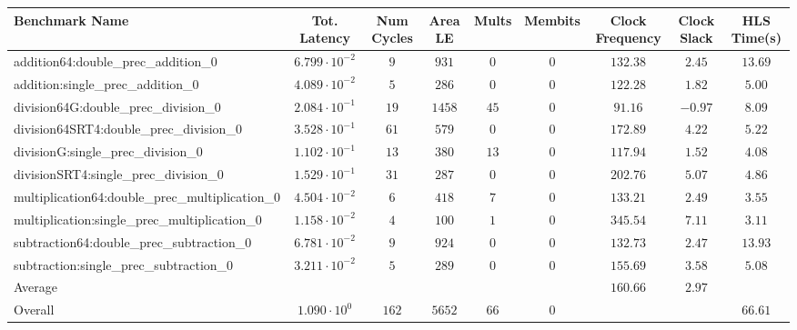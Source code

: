\begin{tabular}{|l|c|c|c|c|c|c|c|c|}
\hline
Benchmark Name                                   & Tot. Latency            & Num Cycles & Area LE  & Mults  & Membits & Clock Frequency & Clock Slack & HLS Time(s) \\
\hline
addition64:double\_prec\_addition\_0             & $ 6.799 \cdot 10^{-2} $ & $ 9      $ & $ 931  $ & $ 0  $ & $ 0   $ & $ 132.38      $ & $ 2.45    $ & $ 13.69   $ \\
addition:single\_prec\_addition\_0               & $ 4.089 \cdot 10^{-2} $ & $ 5      $ & $ 286  $ & $ 0  $ & $ 0   $ & $ 122.28      $ & $ 1.82    $ & $ 5.00    $ \\
division64G:double\_prec\_division\_0            & $ 2.084 \cdot 10^{-1} $ & $ 19     $ & $ 1458 $ & $ 45 $ & $ 0   $ & $ 91.16       $ & $ -0.97   $ & $ 8.09    $ \\
division64SRT4:double\_prec\_division\_0         & $ 3.528 \cdot 10^{-1} $ & $ 61     $ & $ 579  $ & $ 0  $ & $ 0   $ & $ 172.89      $ & $ 4.22    $ & $ 5.22    $ \\
divisionG:single\_prec\_division\_0              & $ 1.102 \cdot 10^{-1} $ & $ 13     $ & $ 380  $ & $ 13 $ & $ 0   $ & $ 117.94      $ & $ 1.52    $ & $ 4.08    $ \\
divisionSRT4:single\_prec\_division\_0           & $ 1.529 \cdot 10^{-1} $ & $ 31     $ & $ 287  $ & $ 0  $ & $ 0   $ & $ 202.76      $ & $ 5.07    $ & $ 4.86    $ \\
multiplication64:double\_prec\_multiplication\_0 & $ 4.504 \cdot 10^{-2} $ & $ 6      $ & $ 418  $ & $ 7  $ & $ 0   $ & $ 133.21      $ & $ 2.49    $ & $ 3.55    $ \\
multiplication:single\_prec\_multiplication\_0   & $ 1.158 \cdot 10^{-2} $ & $ 4      $ & $ 100  $ & $ 1  $ & $ 0   $ & $ 345.54      $ & $ 7.11    $ & $ 3.11    $ \\
subtraction64:double\_prec\_subtraction\_0       & $ 6.781 \cdot 10^{-2} $ & $ 9      $ & $ 924  $ & $ 0  $ & $ 0   $ & $ 132.73      $ & $ 2.47    $ & $ 13.93   $ \\
subtraction:single\_prec\_subtraction\_0         & $ 3.211 \cdot 10^{-2} $ & $ 5      $ & $ 289  $ & $ 0  $ & $ 0   $ & $ 155.69      $ & $ 3.58    $ & $ 5.08    $ \\
\hline
Average                                          & $                     $ & $        $ & $      $ & $    $ & $     $ & $ 160.66      $ & $ 2.97    $ & $         $ \\
\hline
Overall                                          & $ 1.090 \cdot 10^{0}  $ & $ 162    $ & $ 5652 $ & $ 66 $ & $ 0   $ & $             $ & $         $ & $ 66.61   $ \\
\hline
\end{tabular}

